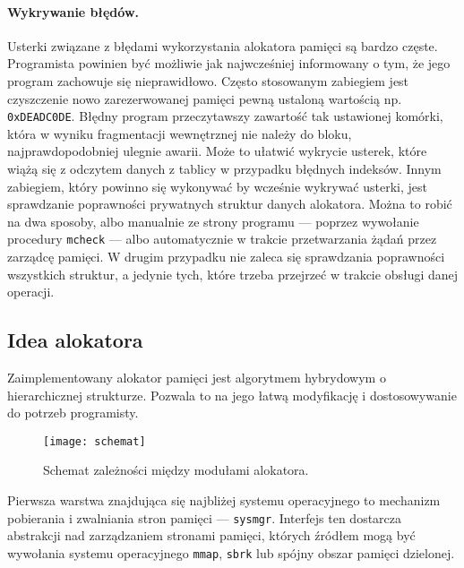 \documentclass[12pt,a4paper,titlepage,twoside]{mwart}
\begin{document}
\paragraph{Wykrywanie błędów.} Usterki związane z błędami wykorzystania
alokatora pamięci są bardzo częste. Programista powinien być możliwie jak
najwcześniej informowany o tym, że jego program zachowuje się nieprawidłowo.
Często stosowanym zabiegiem jest czyszczenie nowo zarezerwowanej pamięci pewną
ustaloną wartością np. \texttt{0xDEADC0DE}. Błędny program przeczytawszy
zawartość tak ustawionej komórki, która w wyniku fragmentacji wewnętrznej nie
należy do bloku, najprawdopodobniej ulegnie awarii. Może to ułatwić wykrycie
usterek, które wiążą się z odczytem danych z tablicy w przypadku błędnych
indeksów. Innym zabiegiem, który powinno się wykonywać by wcześnie wykrywać
usterki, jest sprawdzanie poprawności prywatnych struktur danych alokatora.
Można to robić na dwa sposoby, albo manualnie ze strony programu --- poprzez
wywołanie procedury \texttt{mcheck} --- albo automatycznie w trakcie
przetwarzania żądań przez zarządcę pamięci. W drugim przypadku nie zaleca się
sprawdzania poprawności wszystkich struktur, a jedynie tych, które trzeba
przejrzeć w trakcie obsługi danej operacji.

\subsection{Idea alokatora}

Zaimplementowany alokator pamięci jest algorytmem hybrydowym o hierarchicznej
strukturze. Pozwala to na jego łatwą modyfikację i dostosowywanie do potrzeb
programisty.

\begin{figure}[ht]
\centering
\texttt{[image: schemat]}
\caption{Schemat zależności między modułami alokatora.}
\end{figure}

Pierwsza warstwa znajdująca się najbliżej systemu operacyjnego to mechanizm
pobierania i zwalniania stron pamięci --- \texttt{sysmgr}. Interfejs ten
dostarcza abstrakcji nad zarządzaniem stronami pamięci, których źródłem mogą
być wywołania systemu operacyjnego \texttt{mmap}, \texttt{sbrk} lub spójny
obszar pamięci dzielonej.
\end{document}
